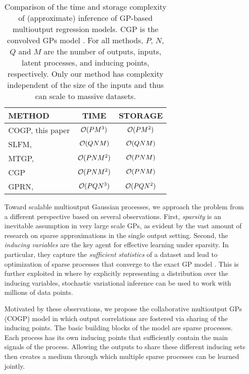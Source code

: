 \setlength{\tabcolsep}{4pt}
\begin{table}[t]
\caption{Comparison of the time and storage complexity of (approximate) inference of GP-based multioutput regression models. CGP is the convolved GPs model \citep{alvarez-lawrence-nips-08}. For all methods, $P$, $N$, $Q$ and $M$ are the number of outputs, inputs, latent processes, and inducing points, respectively. Only our method has complexity independent of the size of the inputs and thus can scale to massive datasets.}
\label{tab:complexity}
\begin{center}
\begin{tabular}{lcc}
\toprule
\textbf{METHOD} & \textbf{TIME} & \textbf{STORAGE} \\ \hline
COGP, this paper  & $\mathcal{O}(PM^3)$ & $\mathcal{O}(PM^2)$ \\
SLFM, \citep{teh-et-al-aistats-05} & $\mathcal{O}(QNM)$ & $\mathcal{O}(QNM)$ \\
MTGP, \citep{bonilla-et-al-nips-08} & $\mathcal{O}(PNM^2)$ & $\mathcal{O}(PNM)$\\ 
CGP & $\mathcal{O}(PNM^2)$ & $\mathcal{O}(PNM)$ \\
GPRN, \citep{wilson-et-al-icml-12} & $\mathcal{O}(PQN^3)$ & $\mathcal{O}(PQN^2)$ \\
\bottomrule
\end{tabular}
\end{center}
\end{table}

Toward scalable multioutput Gaussian processes, we approach the problem from a different perspective based on several observations.
First, \emph{sparsity} is an inevitable assumption in very large scale GPs, as evident by the vast amount of research on sparse approximations in the single output setting. %
Second, the \emph{inducing variables} are the key agent for effective learning under sparsity.
In particular, they capture the \emph{sufficient statistics} of a dataset and lead to optimization of sparse processes that converge to the exact GP model \citep{titsias2009variational}.
This is further exploited in \cite{hensmangaussian} where by explicitly representing a distribution over the inducing variables, stochastic variational inference can be used to work with millions of data points.

Motivated by these observations, we propose the collaborative multioutput GPs (COGP) model in which output correlations are fostered via sharing of the inducing points.
The basic building blocks of the model are sparse processes.
Each process has its own inducing points that sufficiently contain the main signals of the process. 
Allowing the outputs to share these different inducing sets then creates a medium through which multiple sparse processes can be learned jointly. 

